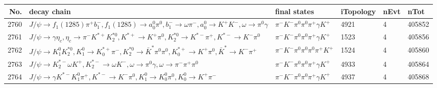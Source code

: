 \begin{table}[htbp] 
\begin{center}
\begin{small}
\begin{tabular}{rlllll}\hline\hline
 No. & decay chain & final states &  iTopology & nEvt & nTot \\\hline
2760&$J/\psi       \rightarrow f_{1}(1285)    \pi^{+}        b_{1}^{-}      , f_{1}(1285)     \rightarrow a_{0}^{0}      \pi^{0}        , b_{1}^{-}       \rightarrow \omega         \pi^{-}        , a_{0}^{0}       \rightarrow K^{+}          K^{-}          , \omega          \rightarrow \pi^{0}        \gamma       $&$\pi^{-}        K^{-}          \pi^{0}        \pi^{0}        \pi^{+}        \gamma       K^{+}          $& 4921&    4&405852\\
2761&$J/\psi       \rightarrow \gamma       \eta_{c}    , \eta_{c}     \rightarrow \pi^{-}        K^{*+}         K_2^{*0}       , K^{*+}          \rightarrow K^{+}          \pi^{0}        , K_2^{*0}        \rightarrow K^{*-}         \pi^{+}        , K^{*-}          \rightarrow K^{-}          \pi^{0}        $&$\pi^{-}        K^{-}          \pi^{0}        \pi^{0}        \pi^{+}        \gamma       K^{+}          $& 1523&    4&405856\\
2762&$J/\psi       \rightarrow K_1^{0}        K_2^{*0}       , K_1^{0}         \rightarrow K_{0}^{*+}     \pi^{-}        , K_2^{*0}        \rightarrow \bar{K}^{*}   \pi^{0}        \pi^{0}        , K_{0}^{*+}      \rightarrow K^{+}          \pi^{0}        , \bar{K}^{*}    \rightarrow K^{-}          \pi^{+}        $&$\pi^{-}        K^{-}          \pi^{0}        \pi^{0}        \pi^{0}        \pi^{+}        K^{+}          $& 1524&    4&405860\\
2763&$J/\psi       \rightarrow K_2^{*-}       \omega         K^{+}          , K_2^{*-}        \rightarrow \omega         K^{-}          , \omega          \rightarrow \pi^{0}        \gamma       , \omega          \rightarrow \pi^{-}        \pi^{+}        \pi^{0}        $&$\pi^{-}        K^{-}          \pi^{0}        \pi^{0}        \pi^{+}        \gamma       K^{+}          $& 4933&    4&405864\\
2764&$J/\psi       \rightarrow \gamma       K^{*-}         K_1^{0}        \pi^{+}        , K^{*-}          \rightarrow K^{-}          \pi^{0}        , K_1^{0}         \rightarrow K_0^{0}        \pi^{0}        , K_0^{0}         \rightarrow K^{+}          \pi^{-}        $&$\pi^{-}        K^{-}          \pi^{0}        \pi^{0}        \pi^{+}        \gamma       K^{+}          $& 4937&    4&405868\\

\end{tabular}
\end{small}
\end{center}
\end{table}
